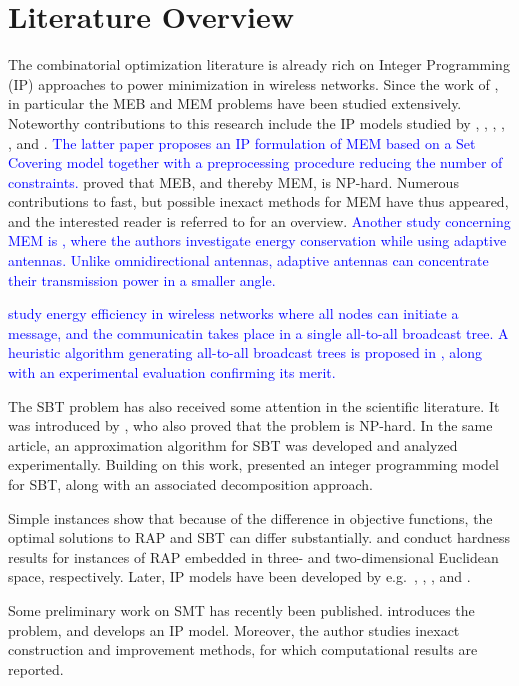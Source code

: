 \section{Literature Overview}
\label{sec:literature}
The combinatorial optimization literature is already rich on Integer Programming (IP) approaches to power minimization in wireless networks.
Since the work of \citet{Wieseltier00onthe}, in particular the MEB and MEM problems have been studied extensively.
Noteworthy contributions to this research include the IP models studied by \citet{das03},
\citet{altinkemer05}, \citet{yuan05}, \citet{yuan08}, \citet{bauer08}, \citet{montemanni11} and \citet{leggieri08}. 
\textcolor{blue}{
The latter paper proposes an IP formulation of MEM based on a Set Covering model together with a preprocessing procedure reducing the number of constraints.}
\citet{cagalj02} proved that MEB, and thereby MEM, is NP-hard.
Numerous contributions to fast, but possible inexact methods for MEM have thus appeared, and the interested reader is referred to \citep{hsiao13} for an overview. 
\textcolor{blue}{Another study concerning MEM is \cite{guo}, where the authors investigate energy conservation while using adaptive antennas. 
Unlike omnidirectional antennas, adaptive antennas can concentrate their transmission power in a smaller angle.}

\textcolor{blue}{\citet{bein10} study energy efficiency in wireless networks where all nodes can initiate a message, and the communicatin takes place in a single all-to-all broadcast tree.
A heuristic algorithm generating all-to-all broadcast trees is proposed in \citet{bhukya14}, along with an experimental evaluation confirming its merit.}

The SBT problem has also received some attention in the scientific literature.
It was introduced by \citet{Papadimitriou06SBT}, who also proved that the problem is NP-hard.
In the same article, an approximation algorithm for SBT was developed and analyzed experimentally.
Building on this work, \citet{Haugland12Dual} presented an integer programming model for SBT, along with an associated decomposition approach.

Simple instances \citep{Haugland12Dual} show that because of the difference in objective functions, the optimal solutions to RAP and SBT can differ substantially.
\citet{kirousis97} and \citet{clementi99} conduct
hardness results for instances of RAP embedded in three- and two-dimensional Euclidean space, respectively.
Later, IP models have been developed by e.g.\ \citet{althaus03}, \citet{montemanni04}, \citet{das05}, and \citet{Haugland11Compact}.

Some preliminary work on SMT has recently been published.
\citet{ivanova16isco} introduces the problem, and develops an IP model.
Moreover, the author studies inexact construction and improvement methods, for which computational results are reported.
